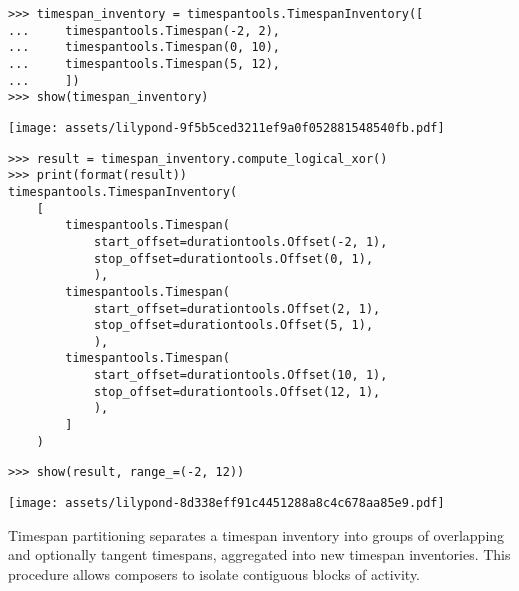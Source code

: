 \begin{singlespacing}
\vspace{-0.5\baselineskip}
\begin{lstlisting}
>>> timespan_inventory = timespantools.TimespanInventory([
...     timespantools.Timespan(-2, 2),
...     timespantools.Timespan(0, 10),
...     timespantools.Timespan(5, 12),
...     ])
>>> show(timespan_inventory)
\end{lstlisting}
\noindent\texttt{[image: assets/lilypond-9f5b5ced3211ef9a0f052881548540fb.pdf]}
\begin{lstlisting}
>>> result = timespan_inventory.compute_logical_xor()
>>> print(format(result))
timespantools.TimespanInventory(
    [
        timespantools.Timespan(
            start_offset=durationtools.Offset(-2, 1),
            stop_offset=durationtools.Offset(0, 1),
            ),
        timespantools.Timespan(
            start_offset=durationtools.Offset(2, 1),
            stop_offset=durationtools.Offset(5, 1),
            ),
        timespantools.Timespan(
            start_offset=durationtools.Offset(10, 1),
            stop_offset=durationtools.Offset(12, 1),
            ),
        ]
    )
\end{lstlisting}
\begin{lstlisting}
>>> show(result, range_=(-2, 12))
\end{lstlisting}
\noindent\texttt{[image: assets/lilypond-8d338eff91c4451288a8c4c678aa85e9.pdf]}
\end{singlespacing}

Timespan partitioning separates a timespan inventory into groups of overlapping
and optionally tangent timespans, aggregated into new timespan inventories.
This procedure allows composers to isolate contiguous blocks of activity.

\begin{comment}
<abjad>
timespan_inventory = timespantools.TimespanInventory([
    timespantools.Timespan(0, 10),
    timespantools.Timespan(5, 15),
    timespantools.Timespan(15, 20),
    timespantools.Timespan(25, 30),
    ])
show(timespan_inventory)
for shard in timespan_inventory.partition():
    show(shard, range_=(0, 30))

for shard in timespan_inventory.partition(include_tangent_timespans=True):
    show(shard, range_=(0, 30))

</abjad>
\end{comment}

